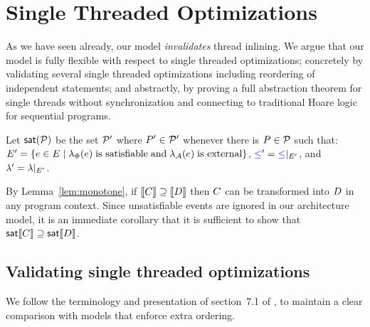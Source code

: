 \section{Single Threaded Optimizations}
\label{sec:opt}



As we have seen already, our model {\em invalidates} thread inlining.  We argue that our model is fully flexible with respect to single threaded optimizations; concretely by validating several 
single threaded optimizations including reordering of independent statements; and abstractly, by proving a full abstraction
theorem for single threads without synchronization and connecting to traditional Hoare logic for sequential programs. 



Let $\mathsf{sat}(\mathcal{P})$ be the set $\mathcal{P}'$ where $P'\in\mathcal{P}'$ whenever
there is $P\in\mathcal{P}$ such that:
$E' = \{e \in E\mid \lambda_{\Phi}(e)\;\text{is satisfiable}\;\allowbreak\text{and}\allowbreak\; \lambda_{\mathcal{A}}(e)\;\text{is external}\}$,
${\mathrel{{\color{blue}\leq}}'} = {\mathrel{{\color{blue}\leq}}}\mathbin{|}_{E'}$,
and
${\lambda'} = {\lambda}\mathbin{|}_{E'}$.

By Lemma~\ref{lem:monotone}, if $\llbracket C\rrbracket \supseteq \llbracket D\rrbracket$
then $C$ can be transformed into $D$ in any program context.  Since
unsatisfiable events are ignored in our architecture model, it is
an immediate corollary that it is sufficient to show that
$\mathsf{sat}\llbracket C\rrbracket \supseteq \mathsf{sat}\llbracket D\rrbracket$.



\subsection{Validating single threaded optimizations}
We follow the terminology and presentation of section~7.1 of
\citet{Dolan:2018:BDR:3192366.3192421}, to maintain a clear comparison with
models that enforce extra ordering.

